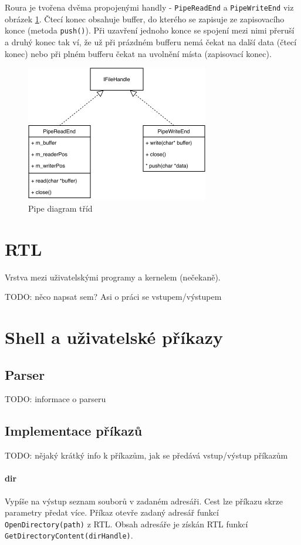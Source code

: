 \documentclass[11pt,a4paper]{scrartcl}
\begin{document}
	Roura je tvořena dvěma propojenými handly - \verb|PipeReadEnd| a \verb|PipeWriteEnd| viz obrázek \ref{fig:pipe-c}. Čtecí konec obsahuje buffer, do kterého se zapisuje ze zapisovacího konce (metoda \verb|push()|). Při uzavření jednoho konce se spojení mezi nimi přeruší a druhý konec tak ví, že už při prázdném bufferu nemá čekat na další data (čtecí konec) nebo při plném bufferu čekat na uvolnění místa (zapisovací konec).
	
	\begin{figure}[H]
		\centering
		\includegraphics[width=8cm]{pipe-c.pdf}
		\caption{Pipe diagram tříd}
		\label{fig:pipe-c}
	\end{figure}
	
	\section{RTL}
	Vrstva mezi uživatelskými programy a kernelem (nečekaně).
	
	TODO: něco napsat sem? Asi o práci se vstupem/výstupem
	
	\section{Shell a uživatelské příkazy}
	
	\subsection{Parser}
	TODO: informace o parseru
	
	\subsection{Implementace příkazů}
	TODO: nějaký krátký info k příkazům, jak se předává vstup/výstup příkazům
	
	\paragraph{dir}
	Vypíše na výstup seznam souborů v zadaném adresáři. Cest lze příkazu skrze parametry předat více. Příkaz otevře zadaný adresář funkcí \verb|OpenDirectory(path)| z RTL. Obsah adresáře je získán RTL funkcí \verb|GetDirectoryContent(dirHandle)|.
	
\end{document}
